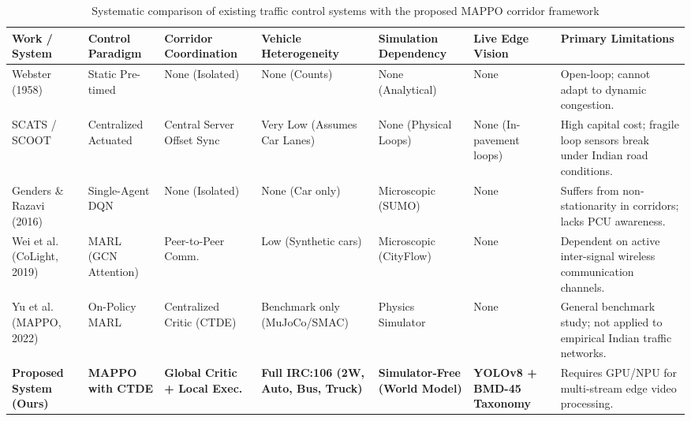 \begin{table}[htbp]
\centering
\scriptsize
\setlength{\tabcolsep}{3pt}
\caption{Systematic comparison of existing traffic control systems with the proposed MAPPO corridor framework}
\label{tab:lit_survey_summary}
\begin{tabularx}{\textwidth}{|p{2.3cm}|p{1.7cm}|p{1.8cm}|p{1.9cm}|p{1.8cm}|p{1.8cm}|X|}
\hline
\textbf{Work / System} & \textbf{Control Paradigm} & \textbf{Corridor Coordination} & \textbf{Vehicle Heterogeneity} & \textbf{Simulation Dependency} & \textbf{Live Edge Vision} & \textbf{Primary Limitations} \\ \hline
Webster (1958) \cite{ref_webster1958} & Static Pre-timed & None (Isolated) & None (Counts) & None (Analytical) & None & Open-loop; cannot adapt to dynamic congestion. \\ \hline
SCATS / SCOOT \cite{ref_scats1980, ref_hunt1981} & Centralized Actuated & Central Server Offset Sync & Very Low (Assumes Car Lanes) & None (Physical Loops) & None (In-pavement loops) & High capital cost; fragile loop sensors break under Indian road conditions. \\ \hline
Genders \& Razavi (2016) \cite{ref_genders2016} & Single-Agent DQN & None (Isolated) & None (Car only) & Microscopic (SUMO) & None & Suffers from non-stationarity in corridors; lacks PCU awareness. \\ \hline
Wei et al. (CoLight, 2019) \cite{ref_wei2019colight} & MARL (GCN Attention) & Peer-to-Peer Comm. & Low (Synthetic cars) & Microscopic (CityFlow) & None & Dependent on active inter-signal wireless communication channels. \\ \hline
Yu et al. (MAPPO, 2022) \cite{ref_mappo2022} & On-Policy MARL & Centralized Critic (CTDE) & Benchmark only (MuJoCo/SMAC) & Physics Simulator & None & General benchmark study; not applied to empirical Indian traffic networks. \\ \hline
\textbf{Proposed System (Ours)} & \textbf{MAPPO with CTDE} & \textbf{Global Critic + Local Exec.} & \textbf{Full IRC:106 (2W, Auto, Bus, Truck)} & \textbf{Simulator-Free (World Model)} & \textbf{YOLOv8 + BMD-45 Taxonomy} & Requires GPU/NPU for multi-stream edge video processing. \\ \hline
\end{tabularx}
\end{table}


